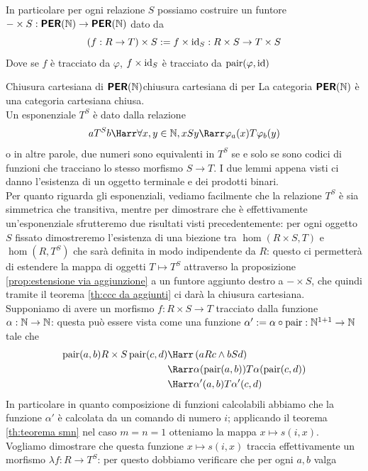 \documentclass[openany]{book}
\begin{document}
In particolare per ogni relazione $S$ possiamo costruire un funtore $-\times S : \text{\sffamily\textbf{PER}}(\mathbb{N})\to\text{\sffamily\textbf{PER}}(\mathbb{N})$ dato da
\[ (f:R\to T)\times S := f\times \operatorname{id}_S : R\times S \to T\times S \]
Dove se $f$ è tracciato da $\varphi$, $f\times \operatorname{id}_S$ è tracciato da $\operatorname{pair}(\varphi, \operatorname{id})$

\begin{theorem}{Chiusura cartesiana di $\text{\sffamily\textbf{PER}}(\mathbb{N})$}{chiusura cartesiana di per}
    La categoria $\text{\sffamily\textbf{PER}}(\mathbb{N})$ è una categoria cartesiana chiusa.\\
    Un esponenziale $T^S$ è dato dalla relazione 
    \[ aT^Sb \Harr \forall x,y \in \N, xSy \Rarr \varphi_a(x)T\varphi_b(y) \]
    o in altre parole, due numeri sono equivalenti in $T^S$ se e solo se sono codici  di funzioni che tracciano lo stesso morfismo $S\to T$.
    \proof 
    I due lemmi appena visti ci danno l'esistenza di un oggetto terminale e dei prodotti binari.\\
    Per quanto riguarda gli esponenziali, vediamo facilmente che la relazione $T^S$ è sia simmetrica che transitiva, mentre per dimostrare che è effettivamente un'esponenziale sfrutteremo due risultati visti precedentemente: per ogni oggetto $S$ fissato dimostreremo l'esistenza di una biezione tra $\hom(R\times S, T)$ e $\hom(R, T^S)$ che sarà definita in modo indipendente da $R$: questo ci permetterà di estendere la mappa di oggetti $T\mapsto T^S$ attraverso la proposizione \cref{prop:estensione via aggiunzione} a un funtore aggiunto destro a $-\times S$, che quindi tramite il teorema \cref{th:ccc da aggiunti} ci darà la chiusura cartesiana.\\
    Supponiamo di avere un morfismo $f:R\times S \to T$ tracciato dalla funzione $\alpha :\mathbb{N}\to \mathbb{N}$: questa può essere vista come una funzione $\alpha':= \alpha \circ \operatorname{pair} : \mathbb{N}^{1+1}\to\mathbb{N}$ tale che 
    \begin{align*}
        \pair(a,b)R\times S \pair(c,d) & \Harr \left( aRc \wedge bSd \right) \\
        & \Rarr \alpha(\pair(a,b))T \alpha (\pair(c,d)) \\
        & \Harr  \alpha'(a,b)T\alpha'(c,d) 
    \end{align*}
    In particolare in quanto composizione di funzioni calcolabili abbiamo che la funzione $\alpha'$ è calcolata da un comando di numero $i$; applicando il teorema \cref{th:teorema smn} nel caso $m=n=1$ otteniamo la mappa $x\mapsto s(i,x)$.\\
    Vogliamo dimostrare che questa funzione $x\mapsto s(i,x)$ traccia effettivamente un morfismo $\lambda f: R \to T^S$: per questo dobbiamo verificare che per ogni $a,b$ valga 

\end{theorem}
\end{document}

